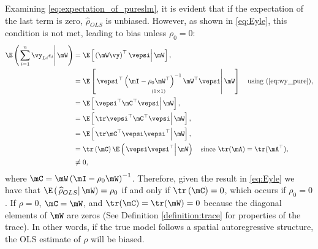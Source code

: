\documentclass[english,12pt]{book}\usepackage[]{graphicx}\usepackage[]{xcolor}
\begin{document}
Examining \eqref{eq:expectation_of_pureslm}, it is evident that if the expectation of the last term is zero, $\widehat{\rho}_{OLS}$ is unbiased. However, as shown in \eqref{eq:Eyle}, this condition is not met, leading to bias unless $\rho_0 = 0$:
\begin{equation}\label{eq:Eyle}
  \begin{aligned}
      \E\left(\left.\sum_{i = 1}^{n}\vy_{Li}\epsilon_i \right| \mW\right) & =  \E\left[\left.\left(\mW\vy \right)^\top\vepsi\right| \mW\right], \\
      & =  \E\left[\left.\underset{(1\times 1)}{\vepsi^\top \left( \mI -\rho_0\mW^\top\right)^{-1}\mW^\top\vepsi} \right| \mW \right] \quad \mbox{using (\ref{eq:wy_pure})},\\
      & =  \E\left[\left.\vepsi^\top \mC^\top \vepsi \right| \mW\right], \\
      & = \E\left[\left.\tr \vepsi^\top  \mC^\top\vepsi\right|\mW \right], \\
      & = \E\left[\left.\tr \mC^\top \vepsi\vepsi^\top\right| \mW\right], \\
      & =  \tr \left(\mC\right) \E\left(\left.\vepsi\vepsi^\top\right| \mW\right)\quad \mbox{since $\tr(\mA) = \tr(\mA^\top)$}, \\
      & \neq 0,
  \end{aligned}
\end{equation}
%
where $\mC = \mW\left( \mI -\rho_0\mW\right)^{-1}$. Therefore, given the result in \eqref{eq:Eyle} we have that $\E\left(\left.\widehat{\rho}_{OLS}\right| \mW\right) = \rho_0$ if and only if $\tr \left(\mC\right) = 0$, which occurs if $\rho_0 = 0$. If $\rho = 0$, $\mC = \mW$, and $\tr(\mC) = \tr(\mW) = 0$ because the diagonal elements of $\mW$ are zeros (See Definition \ref{definition:trace} for properties of the trace).  In other words, if the true model follows a spatial autoregressive structure, the OLS estimate of $\rho$ will be biased. 
\end{document}
